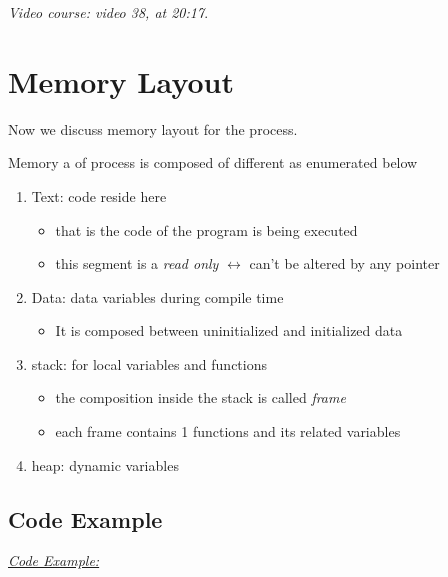 \documentclass[12pt,a4paper]{book}
\begin{document}
 \textit{Video course: video 38, at 20:17}.

\newpage
\section{Memory Layout}
Now we discuss memory layout for the process.

Memory a of process is composed of different  as enumerated below

\begin{enumerate}

\item Text: code reside here

    \begin{itemize}
        \item that is the code of the program is being executed

        \item this segment is a \textit{read only} $\leftrightarrow$ can't be altered by any pointer
    \end{itemize}

\item Data: data variables during compile time

    \begin{itemize}
        \item It is composed between uninitialized and initialized data 
    \end{itemize}

\item  stack: for local variables and functions

    \begin{itemize}
        \item the composition inside the stack is called \textit{frame}

        \item each frame contains 1 functions and its related variables
    \end{itemize}

\item heap: dynamic variables

\end{enumerate}

\subsection{Code Example}

 \underline{\textit{Code Example:}}
\end{document}
